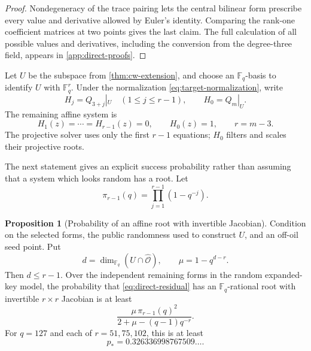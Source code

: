 \documentclass[11pt,a4paper]{article}
\theoremstyle{definition}
\newtheorem{proposition}[theorem]{Proposition}
\theoremstyle{remark}
\newcommand{\F}{\mathbb F}
\newcommand{\cO}{\mathcal O}
\begin{document}
\begin{proof}
Nondegeneracy of the trace pairing lets the central bilinear form prescribe
every value and derivative allowed by Euler's identity.  Comparing the
rank-one coefficient matrices at two points gives the last claim.  The full
calculation of all possible values and derivatives, including the conversion
from the degree-three field, appears in
\cref{app:direct-proofs}.
\end{proof}

Let $U$ be the subspace from \cref{thm:cw-extension}, and choose an $\F_q$-basis
to identify $U$ with $\F_q^r$.  Under the normalization
\eqref{eq:target-normalization}, write
\[
 H_j=Q_{3+j}|_U\quad(1\le j\le r-1),
 \qquad H_0=Q_m|_U.
\]
The remaining affine system is
\begin{equation}\label{eq:direct-residual}
 H_1(z)=\cdots=H_{r-1}(z)=0,
 \qquad H_0(z)=1,
 \qquad r=m-3.
\end{equation}
The projective solver uses only the first $r-1$ equations; $H_0$ filters and
scales their projective roots.

The next statement gives an explicit success probability rather than assuming
that a system which looks random has a root.  Let
\begin{equation}\label{eq:pi-r-direct}
 \pi_{r-1}(q)=\prod_{j=1}^{r-1}(1-q^{-j}).
\end{equation}

\begin{proposition}[Probability of an affine root with invertible Jacobian]\label{prop:direct-root-probability}
Condition on the selected forms, the public randomness used to construct $U$, and
an off-oil seed point.  Put
\[
 d=\dim_{\F_q}(U\cap\widehat{\cO}),
 \qquad
 \mu=1-q^{d-r}.
\]
Then $d\le r-1$.  Over the independent remaining forms in the random
expanded-key model,
the probability that \eqref{eq:direct-residual} has an $\F_q$-rational root
with invertible $r\times r$ Jacobian is at least
\begin{equation}\label{eq:direct-root-lower-bound}
 \frac{\mu\,\pi_{r-1}(q)^2}
 {2+\mu-(q-1)q^{-r}}.
\end{equation}
For $q=127$ and each of $r=51,75,102$, this is at least
\begin{equation}\label{eq:direct-root-number}
 p_*=0.326336998767509\ldots.
\end{equation}
\end{proposition}
\end{document}
